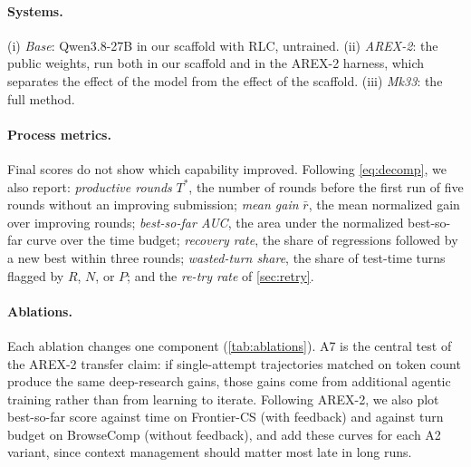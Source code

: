 \documentclass[11pt]{article}
\begin{document}
\paragraph{Systems.}
(i) \emph{Base}: Qwen3.8-27B in our scaffold with RLC, untrained. (ii) \emph{AREX-2}: the public weights, run both in our scaffold and in the AREX-2 harness, which separates the effect of the model from the effect of the scaffold. (iii) \emph{Mk33}: the full method.

\paragraph{Process metrics.}
Final scores do not show which capability improved. Following \cref{eq:decomp}, we also report: \emph{productive rounds} $T^{*}$, the number of rounds before the first run of five rounds without an improving submission; \emph{mean gain} $\bar{r}$, the mean normalized gain over improving rounds; \emph{best-so-far AUC}, the area under the normalized best-so-far curve over the time budget; \emph{recovery rate}, the share of regressions followed by a new best within three rounds; \emph{wasted-turn share}, the share of test-time turns flagged by $R$, $N$, or $P$; and the \emph{re-try rate} of \cref{sec:retry}.

\paragraph{Ablations.}
Each ablation changes one component (\cref{tab:ablations}). A7 is the central test of the AREX-2 transfer claim: if single-attempt trajectories matched on token count produce the same deep-research gains, those gains come from additional agentic training rather than from learning to iterate. Following AREX-2, we also plot best-so-far score against time on Frontier-CS (with feedback) and against turn budget on BrowseComp (without feedback), and add these curves for each A2 variant, since context management should matter most late in long runs.
\end{document}
